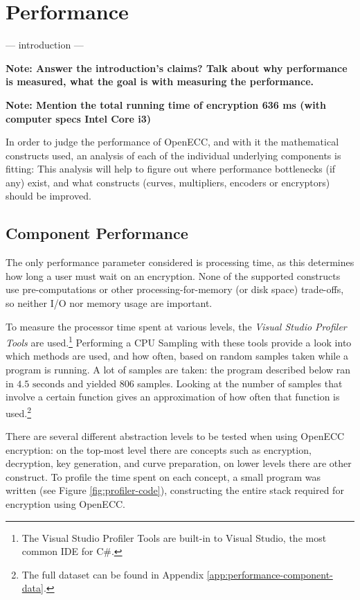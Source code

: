 \section{Performance}
\label{sec:performance}

 --- introduction ---
 
 \textbf{Note: Answer the introduction's claims? Talk about why performance is measured, what the goal is with measuring the
 performance.}
 
 \textbf{Note: Mention the total running time of encryption 636 ms (with computer specs Intel Core i3)}
 
 In order to judge the performance of OpenECC, and with it the mathematical constructs used, an analysis of each of the
 individual underlying components is fitting: This analysis will help to figure out where performance bottlenecks (if
 any) exist, and what constructs (curves, multipliers, encoders or encryptors) should be improved.

\subsection{Component Performance}
\label{sec:performance_components}

The only performance parameter considered is processing time, as this determines how long a user must wait on an encryption.
None of the supported constructs use pre-computations or other processing-for-memory (or disk space) trade-offs, so neither
I/O nor memory usage are important.

To measure the processor time spent at various levels, the \emph{Visual Studio Profiler Tools} are used.\footnote{The Visual
Studio Profiler Tools are built-in to Visual Studio, the most common IDE for C\#.} Performing a CPU Sampling with these tools
provide a look into which methods are used, and how often, based on random samples taken while a program is running. A lot of
samples are taken: the program described below ran in \(4.5 \text{ seconds}\) and yielded 806 samples. Looking at the number of samples
that involve a certain function gives an approximation of how often that function is used.\footnote{The full dataset can be
found in Appendix \ref{app:performance-component-data}.}

There are several different abstraction levels to be tested when using OpenECC encryption: on the top-most level there are concepts
such as encryption, decryption, key generation, and curve preparation, on lower levels there are other construct. To profile the time
spent on each concept, a small program was written (see Figure \ref{fig:profiler-code}), constructing the entire stack required for
encryption using OpenECC.


